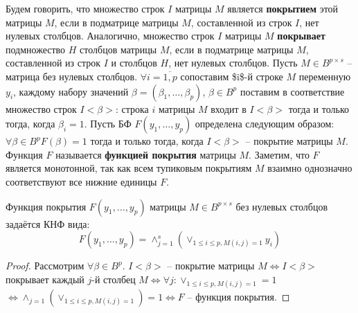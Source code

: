\documentclass[11pt]{article}
\newcounter{th}\setcounter{th}{0}
\newcounter{stnmt}\setcounter{stnmt}{0}
\def\st{\par\smallskip\refstepcounter{stnmt}\textbf{\arabic{stnmt}}}
\newtheorem*{Statement}{Утверждение \st}
\begin{document}
Будем говорить, что множество строк \(I\) матрицы \(M\) является \textbf{покрытием} этой матрицы \(M\),
если в подматрице матрицы \(M\), составленной из строк \(I\), нет нулевых столбцов. Аналогично,
множество строк \(I\) матрицы \(M\) \textbf{покрывает} подмножество \(H\) столбцов матрицы \(M\), если в
подматрице матрицы \(M\), составленной из строк \(I\) и столбцов \(H\), нет нулевых столбцов.
Пусть \(M \in B^{p\times s}\) -- матрица без нулевых столбцов. \(\forall i = \overline{1, p}\)
сопоставим \$i\$-й строке \(M\) переменную \(y_i\), каждому набору значений \(\beta = (\beta_1, \ldots, \beta_p)\),
\(\beta \in B^p\) поставим в соответствие множество строк \(I<\beta>\): строка \(i\) матрицы \(M\)
входит в \(I<\beta>\) тогда и только тогда, когда \(\beta_i = 1\).
Пусть БФ \(F(y_1, \ldots, y_p)\) определена следующим образом: \(\forall \beta \in B^p F(\beta) = 1\)
тогда и только тогда, когда \(I<\beta>\) -- покрытие матрицы \(M\). Функция \(F\) называется
\textbf{функцией покрытия} матрицы \(M\). Заметим, что \(F\) является монотонной, так как всем тупиковым
покрытиям \(M\) взаимно однозначно соответствуют все нижние единицы \(F\).
\begin{Statement}
Функция покрытия $F(y_1, \ldots, y_p)$ матрицы $M \in B^{p\times s}$ без нулевых столбцов задаётся
КНФ вида:
\begin{equation}
F(y_1, \ldots, y_p) = \wedge_{j = 1}^s\left(\vee_{1 \leq i \leq p, M(i, j) = 1}y_i\right)
\end{equation}
\end{Statement}
\begin{proof}
Рассмотрим $\forall \beta \in B^p$. $I<\beta>$ -- покрытие матрицы $M \Leftrightarrow I<\beta>$
покрывает каждый $j$-й столбец $M \Leftrightarrow \forall j: \vee_{1 \leq i \leq p, M(i, j) = 1} = 1$
$\Leftrightarrow \wedge_{j = 1}\left(\vee_{1 \leq i \leq p, M(i, j) = 1}\right) = 1 \Leftrightarrow F$
-- функция покрытия.
\end{proof}
\end{document}
